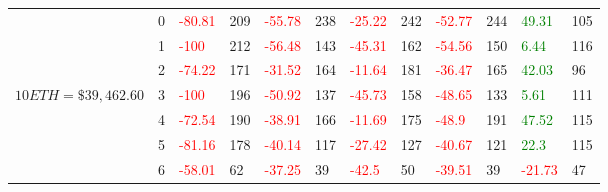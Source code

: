 \begin{table}[htb!]
\begin{adjustwidth}{-0.9in}{-0.9in}
\begin{tabular}{|p{5em}|p{2em}|p{3em}|p{3em}|p{3em}|p{3em}|p{3em}|p{3em}|p{3em}|p{3em}|p{3em}|p{3em}|}
            & 0 & \textcolor{red}{-80.81} & 209 & \textcolor{red}{-55.78} & 238 & \textcolor{red}{-25.22} & 242 & \textcolor{red}{-52.77} & 244 & \textcolor{green}{49.31} & 105\\\cline{3-12}
            & 1 & \textcolor{red}{-100} & 212 & \textcolor{red}{-56.48} & 143 & \textcolor{red}{-45.31} & 162 & \textcolor{red}{-54.56} & 150 & \textcolor{green}{6.44} & 116\\\cline{3-12}
            & 2 & \textcolor{red}{-74.22} & 171 & \textcolor{red}{-31.52} & 164 & \textcolor{red}{-11.64} & 181 & \textcolor{red}{-36.47} & 165 & \textcolor{green}{42.03} & 96\\\cline{3-12}
            $10 ETH = \$39,462.60$ & 3 & \textcolor{red}{-100} & 196 & \textcolor{red}{-50.92} & 137 & \textcolor{red}{-45.73} & 158 & \textcolor{red}{-48.65} & 133 & \textcolor{green}{5.61} & 111\\[-3ex]\cline{3-12}
            & 4 & \textcolor{red}{-72.54} & 190 & \textcolor{red}{-38.91} & 166 & \textcolor{red}{-11.69} & 175 & \textcolor{red}{-48.9} & 191 & \textcolor{green}{47.52} & 115\\\cline{3-12}
            & 5 & \textcolor{red}{-81.16} & 178 & \textcolor{red}{-40.14} & 117 & \textcolor{red}{-27.42} & 127 & \textcolor{red}{-40.67} & 121 & \textcolor{green}{22.3} & 115\\\cline{3-12}
            & 6 & \textcolor{red}{-58.01} & 62 & \textcolor{red}{-37.25} & 39 & \textcolor{red}{-42.5} & 50 & \textcolor{red}{-39.51} & 39 & \textcolor{red}{-21.73} & 47\\\hline\hline


\end{tabular}
\end{adjustwidth}
\end{table}
